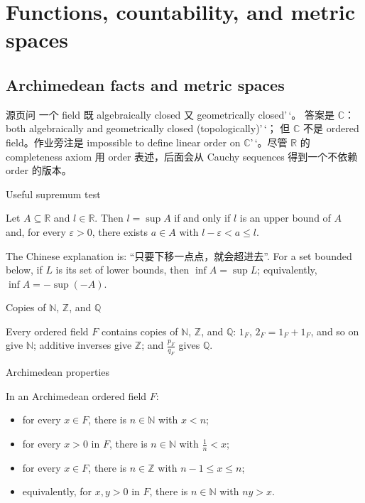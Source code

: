 \chapter{Functions, countability, and metric spaces}

\section{Archimedean facts and metric spaces}

源页问 一个 field 既 algebraically closed 又 geometrically closed'\,`。 答案是 \(\mathbb{C}\)：both algebraically and geometrically closed (topologically)'\,`； 但 \(\mathbb{C}\) 不是 ordered field。作业旁注是 impossible to define linear order on \(\mathbb{C}\)'\,`。尽管 \(\mathbb{R}\) 的 completeness axiom 用 order 表述，后面会从 Cauchy sequences 得到一个不依赖 order 的版本。

\begin{theorem}{Useful supremum test}

Let \(A \subseteq \mathbb{R}\) and \(l \in \mathbb{R}\). Then \(l = \sup A\) if and only if \(l\) is an upper bound of \(A\) and, for every \(\varepsilon > 0\), there exists \(a \in A\) with \(l - \varepsilon < a \leq l\).

\end{theorem}

The Chinese explanation is: ``只要下移一点点，就会超进去''. For a set bounded below, if \(L\) is its set of lower bounds, then \(\inf A = \sup L\); equivalently, \(\inf A = - \sup\left( {- A} \right)\).

\begin{theorem}{Copies of \(\mathbb{N}\), \(\mathbb{Z}\), and \(\mathbb{Q}\)}

Every ordered field \(F\) contains copies of \(\mathbb{N}\), \(\mathbb{Z}\), and \(\mathbb{Q}\): \(1_{F}\), \(2_{F} = 1_{F} + 1_{F}\), and so on give \(\mathbb{N}\); additive inverses give \(\mathbb{Z}\); and \(\frac{p_{F}}{q_{F}}\) gives \(\mathbb{Q}\).

\end{theorem}

\begin{theorem}{Archimedean properties}

In an Archimedean ordered field \(F\):

\begin{itemize}
\tightlist
\item
  for every \(x \in F\), there is \(n \in \mathbb{N}\) with \(x < n\);
\item
  for every \(x > 0\) in \(F\), there is \(n \in \mathbb{N}\) with \(\frac{1}{n} < x\);
\item
  for every \(x \in F\), there is \(n \in \mathbb{Z}\) with \(n - 1 \leq x \leq n\);
\item
  equivalently, for \(x,y > 0\) in \(F\), there is \(n \in \mathbb{N}\) with \(ny > x\).
\end{itemize}

\end{theorem}

